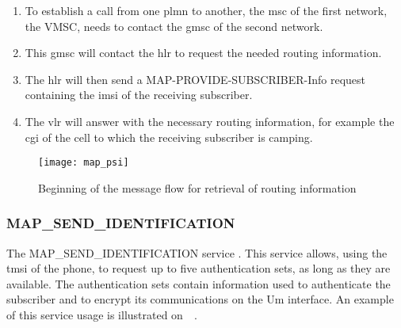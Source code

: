        \begin{enumerate}[topsep=-1em,parsep=0em,itemsep=0em]

          \item To establish a call from one \gls{plmn} to another, the
            \gls{msc} of the first network, the VMSC, needs to contact
            the \gls{gmsc} of the second network.

          \item This \gls{gmsc} will contact the \gls{hlr} to request
            the needed routing information.

          \item The \gls{hlr} will then send a
            MAP-PROVIDE-SUBSCRIBER-Info request containing the
            \gls{imsi} of the receiving subscriber.

          \item The \gls{vlr} will answer with the necessary routing
            information, for example the \gls{cgi} of the cell to which
            the receiving subscriber is camping.

        \end{enumerate}

        \begin{figure}[h]
          \centering
          \texttt{[image: map\_psi]}
          \caption{Beginning of the message flow for retrieval of
            routing information~\cite[p.~639]{3gpp_ts_2015-2}}
          \label{fig:map_psi}
        \end{figure}

      \subsubsection{MAP\_SEND\_IDENTIFICATION}
      \label{sec:si}

       The MAP\_SEND\_IDENTIFICATION service . This service allows, using the \gls{tmsi} of the phone, to
   request up to five authentication sets, as long as they are
   available. The authentication sets contain information used to
   authenticate the subscriber and to encrypt its communications on the
   Um interface. An example of this service usage is illustrated
   on~~\cite[p.~118]{3gpp_ts_2015-2}.

